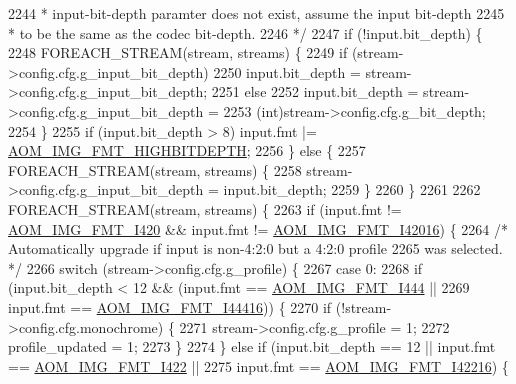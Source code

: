 \begin{DoxyCodeInclude}
{{{{{{{{{{{{{{{{{{{{{{{{{{{{{{{{{{{{{{{{{{{{{{{{{{{{2244 \textcolor{comment}{     * input-bit-depth paramter does not exist, assume the input bit-depth}
2245 \textcolor{comment}{     * to be the same as the codec bit-depth.}
2246 \textcolor{comment}{     */}
2247     \textcolor{keywordflow}{if} (!input.bit\_depth) \{
2248       FOREACH\_STREAM(stream, streams) \{
2249         \textcolor{keywordflow}{if} (stream->config.cfg.g\_input\_bit\_depth)
2250           input.bit\_depth = stream->config.cfg.g\_input\_bit\_depth;
2251         \textcolor{keywordflow}{else}
2252           input.bit\_depth = stream->config.cfg.g\_input\_bit\_depth =
2253               (int)stream->config.cfg.g\_bit\_depth;
2254       \}
2255       \textcolor{keywordflow}{if} (input.bit\_depth > 8) input.fmt |= \hyperlink{aom__image_8h_a607b37d91f75442f54223ecd85f1b6cb}{AOM\_IMG\_FMT\_HIGHBITDEPTH};
2256     \} \textcolor{keywordflow}{else} \{
2257       FOREACH\_STREAM(stream, streams) \{
2258         stream->config.cfg.g\_input\_bit\_depth = input.bit\_depth;
2259       \}
2260     \}
2261 
2262     FOREACH\_STREAM(stream, streams) \{
2263       \textcolor{keywordflow}{if} (input.fmt != \hyperlink{aom__image_8h_a930317c04b4bd0a660bb5e744055523cabd778a3d697463e89d12a1117f417b60}{AOM\_IMG\_FMT\_I420} && input.fmt != 
      \hyperlink{aom__image_8h_a930317c04b4bd0a660bb5e744055523ca20a9cf30277260685642b4cfb4e9273b}{AOM\_IMG\_FMT\_I42016}) \{
2264         \textcolor{comment}{/* Automatically upgrade if input is non-4:2:0 but a 4:2:0 profile}
2265 \textcolor{comment}{           was selected. */}
2266         \textcolor{keywordflow}{switch} (stream->config.cfg.g\_profile) \{
2267           \textcolor{keywordflow}{case} 0:
2268             \textcolor{keywordflow}{if} (input.bit\_depth < 12 && (input.fmt == \hyperlink{aom__image_8h_a930317c04b4bd0a660bb5e744055523ca89d423506e948ab7d3b98b5750b92655}{AOM\_IMG\_FMT\_I444} ||
2269                                          input.fmt == \hyperlink{aom__image_8h_a930317c04b4bd0a660bb5e744055523cab9b93d397dedbdd6bfafec84d1f8f0f5}{AOM\_IMG\_FMT\_I44416})) \{
2270               \textcolor{keywordflow}{if} (!stream->config.cfg.monochrome) \{
2271                 stream->config.cfg.g\_profile = 1;
2272                 profile\_updated = 1;
2273               \}
2274             \} \textcolor{keywordflow}{else} \textcolor{keywordflow}{if} (input.bit\_depth == 12 || input.fmt == \hyperlink{aom__image_8h_a930317c04b4bd0a660bb5e744055523cab2f75281e94ebc0f0bc728ef287cd3e8}{AOM\_IMG\_FMT\_I422} ||
2275                        input.fmt == \hyperlink{aom__image_8h_a930317c04b4bd0a660bb5e744055523ca064683ed4260fc6244af6cfc9d261c22}{AOM\_IMG\_FMT\_I42216}) \{
}}}}}}}}}}}}}}}}}}}}}}}}}}}}}}}}}}}}}}}}}}}}}}}}}}}}
\end{DoxyCodeInclude}
